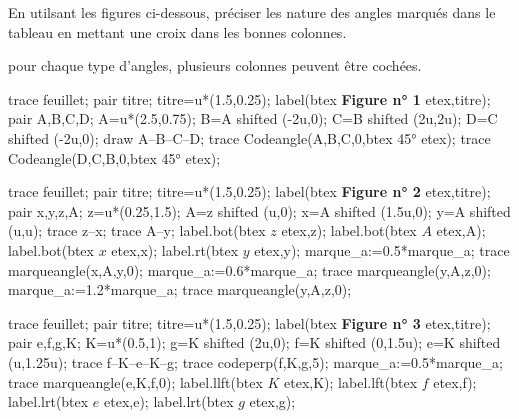\begin{exercice*}
    En utilsant les figures ci-dessous, préciser les nature des angles marqués dans le tableau en mettant une croix dans les bonnes colonnes.\par
    \begin{changemargin}{-10mm}{-20mm}
        \begin{remarque}
            pour chaque type d'angles, plusieurs colonnes peuvent être cochées.
        \end{remarque}
    \end{changemargin}    
    \begin{Geometrie}[CoinHD={(3u,3u)}]
        trace feuillet;
        pair titre;
        titre=u*(1.5,0.25);
        label(btex {\bfseries Figure n° 1 } etex,titre);
        pair A,B,C,D;
        A=u*(2.5,0.75);
        B=A shifted (-2u,0);
        C=B shifted (2u,2u);
        D=C shifted (-2u,0);
        draw A--B--C--D;
        trace Codeangle(A,B,C,0,btex \ang{45} etex); 
        trace Codeangle(D,C,B,0,btex \ang{45} etex);
    \end{Geometrie}
    \begin{Geometrie}[CoinHD={(3u,3u)}]
        trace feuillet;
        pair titre;
        titre=u*(1.5,0.25);
        label(btex {\bfseries Figure n° 2 } etex,titre);
        pair x,y,z,A;
        z=u*(0.25,1.5);
        A=z shifted (u,0);
        x=A shifted (1.5u,0);
        y=A shifted (u,u);
        trace z--x;
        trace A--y;
        label.bot(btex $z$ etex,z);
        label.bot(btex $A$ etex,A);
        label.bot(btex $x$ etex,x);
        label.rt(btex $y$ etex,y);
        marque_a:=0.5*marque_a;
        trace marqueangle(x,A,y,0);
        marque_a:=0.6*marque_a;
        trace marqueangle(y,A,z,0);
        marque_a:=1.2*marque_a;
        trace marqueangle(y,A,z,0);
    \end{Geometrie}
    \begin{Geometrie}[CoinHD={(3u,3u)}]
        trace feuillet;
        pair titre;
        titre=u*(1.5,0.25);
        label(btex {\bfseries Figure n° 3 } etex,titre);
        pair e,f,g,K;
        K=u*(0.5,1);
        g=K shifted (2u,0);
        f=K shifted (0,1.5u);
        e=K shifted (u,1.25u);
        trace f--K--e--K--g;
        trace codeperp(f,K,g,5);
        marque_a:=0.5*marque_a;
        trace marqueangle(e,K,f,0);
        label.llft(btex $K$ etex,K);
        label.lft(btex $f$ etex,f);
        label.lrt(btex $e$ etex,e);
        label.lrt(btex $g$ etex,g);
    \end{Geometrie}
    \par\smallskip

\end{exercice*}
